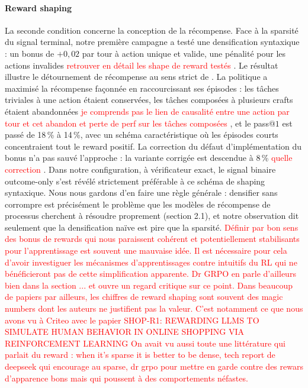 \documentclass[11pt,a4paper]{article}
\begin{document}
\paragraph{Reward shaping} La seconde condition concerne la conception de la récompense. Face à la sparsité du signal terminal, notre première campagne a testé une densification syntaxique : un bonus de $+0{,}02$ par tour à action unique et valide, une pénalité pour les actions invalides \textcolor{red}{retrouver en détail les shape de reward testés} . Le résultat illustre le détournement de récompense au sens strict de \cite{skalse2022defining}. La politique a maximisé la récompense façonnée en raccourcissant ses épisodes : les tâches triviales à une action étaient conservées, les tâches composées à plusieurs crafts étaient abandonnées \textcolor{red}{je comprends pas le lien de causalité entre une action par tour et cet abandon et perte de perf sur les tâches composées} , et le pass@$1$ est passé de 18\,\% à 14\,\%, avec un schéma caractéristique où les épisodes courts concentraient tout le reward positif. La correction du défaut d'implémentation du bonus n'a pas sauvé l'approche : la variante corrigée est descendue à 8\,\% \textcolor{red}{quelle correction} . Dans notre configuration, à vérificateur exact, le signal binaire outcome-only s'est révélé strictement préférable à ce schéma de shaping syntaxique. Nous nous gardons d'en faire une règle générale : densifier sans corrompre est précisément le problème que les modèles de récompense de processus cherchent à résoudre proprement (section 2.1), et notre observation dit seulement que la densification naïve est pire que la sparsité. \textcolor{red}{Définir par bon sens des bonus de rewards qui nous paraissent cohérent et potentiellement stabilisants pour l'apprentissage est souvent une mauvaise idée. Il est nécessaire pour cela d'avoir investiguer les mécanismes d'apprentissages contre intuitifs du RL qui ne bénéficieront pas de cette simplification apparente. Dr GRPO en parle d'ailleurs bien dans la section ... et ouvre un regard critique sur ce point. Dans beaucoup de papiers par ailleurs, les chiffres de reward shaping sont souvent des magic numbers dont les auteurs ne justifient pas la valeur. C'est notamment ce que nous avons vu à Criteo avec le papier SHOP-R1: REWARDING LLMS TO SIMULATE HUMAN BEHAVIOR IN ONLINE SHOPPING VIA REINFORCEMENT LEARNING} 
\textcolor{red}{On avait vu aussi toute une littérature qui parlait du reward : when it's sparse it is better to be dense, tech report de deepseek qui encourage au sparse, dr grpo pour mettre en garde contre des rewars d'apparence bons mais qui poussent à des comportements néfastes.} 
\end{document}
